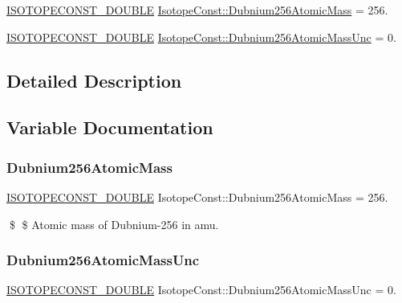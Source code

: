 \begin{DoxyCompactItemize}
\item 
\mbox{\hyperlink{group___isotope_const-_macros_ga8f45a7272ce02c0b4c65c44636ed719a}{I\+S\+O\+T\+O\+P\+E\+C\+O\+N\+S\+T\+\_\+\+D\+O\+U\+B\+LE}} \mbox{\hyperlink{group___isotope_const-_dubnium-_db256_ga165f2d4395611e7e3c3814d7a084d024}{Isotope\+Const\+::\+Dubnium256\+Atomic\+Mass}} = 256.
\item 
\mbox{\hyperlink{group___isotope_const-_macros_ga8f45a7272ce02c0b4c65c44636ed719a}{I\+S\+O\+T\+O\+P\+E\+C\+O\+N\+S\+T\+\_\+\+D\+O\+U\+B\+LE}} \mbox{\hyperlink{group___isotope_const-_dubnium-_db256_ga0e7894debcd2b8cbfb6f570a4109bb90}{Isotope\+Const\+::\+Dubnium256\+Atomic\+Mass\+Unc}} = 0.
\end{DoxyCompactItemize}


\subsection{Detailed Description}


\subsection{Variable Documentation}
\mbox{\label{group___isotope_const-_dubnium-_db256_ga165f2d4395611e7e3c3814d7a084d024}} 
\subsubsection{\texorpdfstring{Dubnium256\+Atomic\+Mass}{Dubnium256AtomicMass}}
{\footnotesize\ttfamily \mbox{\hyperlink{group___isotope_const-_macros_ga8f45a7272ce02c0b4c65c44636ed719a}{I\+S\+O\+T\+O\+P\+E\+C\+O\+N\+S\+T\+\_\+\+D\+O\+U\+B\+LE}} Isotope\+Const\+::\+Dubnium256\+Atomic\+Mass = 256.}

\$ \$ Atomic mass of Dubnium-\/256 in amu. \mbox{\label{group___isotope_const-_dubnium-_db256_ga0e7894debcd2b8cbfb6f570a4109bb90}} 
\subsubsection{\texorpdfstring{Dubnium256\+Atomic\+Mass\+Unc}{Dubnium256AtomicMassUnc}}
{\footnotesize\ttfamily \mbox{\hyperlink{group___isotope_const-_macros_ga8f45a7272ce02c0b4c65c44636ed719a}{I\+S\+O\+T\+O\+P\+E\+C\+O\+N\+S\+T\+\_\+\+D\+O\+U\+B\+LE}} Isotope\+Const\+::\+Dubnium256\+Atomic\+Mass\+Unc = 0.}

